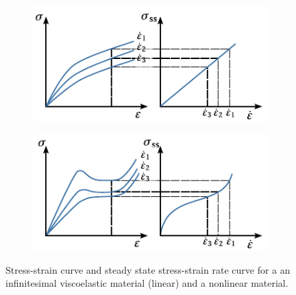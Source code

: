 \begin{figure}[hbtp]
\centering
  \begin{subfigure}[b]{0.49\textwidth}
            \centering
            \includegraphics[width=\textwidth]{figures/constant_strain_rate_expected}
            \caption{}
            \label{subfig:constant_strain_rate_expected}
    \end{subfigure} \hfill
    \begin{subfigure}[b]{0.49\textwidth}
            \centering
            \includegraphics[width=\textwidth]{figures/constant_strain_rate_nonlinear}
            \caption{}
            \label{subfig:constant_strain_rate_nonlinear}
    \end{subfigure}
  \caption{Stress-strain curve and steady state stress-strain rate curve for a  an infinitesimal viscoelastic material (linear) and a  nonlinear material.}
\label{fig:constant_strain_rate_results}
\end{figure}

